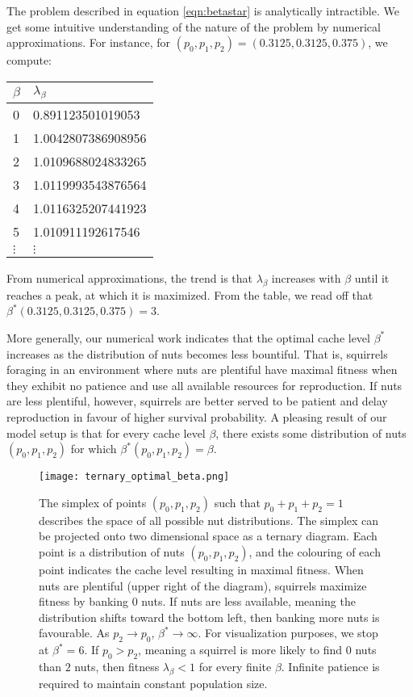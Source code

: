 \documentclass[titlepage, hidelinks, 12pt]{article}
\theoremstyle{plain}
\theoremstyle{remark}
\theoremstyle{definition}
\begin{document}
The problem described in equation \ref{eqn:betastar} is analytically intractible. We get some intuitive understanding of the nature of the problem
by numerical approximations. For instance, for $(p_0, p_1, p_2) = (0.3125, 0.3125, 0.375)$, we compute:
\begin{table}[H]
    \centering
\begin{tabular}{l|l}
$\beta$ & $\lambda_\beta$    \\ \hline
0       & 0.891123501019053  \\
1       & 1.0042807386908956 \\
2       & 1.0109688024833265 \\
3       & 1.0119993543876564 \\
4       & 1.0116325207441923 \\
5       & 1.010911192617546  \\
$\vdots$ & $\vdots$
\end{tabular}
\end{table}
From numerical approximations, the trend is that $\lambda_{\beta}$ increases with $\beta$ until it reaches a peak, at which it is maximized. 
From the table, we read off that $\beta^*(0.3125, 0.3125, 0.375) = 3$. 

More generally, our numerical work indicates that the optimal cache level $\beta^*$ increases as the distribution of nuts becomes less bountiful.
That is, squirrels foraging in an environment where nuts are plentiful have maximal fitness when they exhibit no patience and use all available
resources for reproduction. If nuts are less plentiful, however, squirrels are better served to be patient and delay reproduction in favour of
higher survival probability. A pleasing result of our model setup is that for every cache level $\beta$, there exists some distribution of nuts
$(p_0, p_1, p_2)$ for which $\beta^*(p_0, p_1, p_2) = \beta$.


\begin{figure}[H]
    \centering
    \texttt{[image: ternary\_optimal\_beta.png]}
    \caption{The simplex of points $(p_0, p_1, p_2)$ such that $p_0 + p_1 + p_2 =1$ describes the space of all possible nut distributions.
        The simplex can be projected onto two dimensional space as a ternary diagram. Each point is a distribution of nuts $(p_0, p_1, p_2)$,
        and 
    the colouring of each point indicates the cache level resulting in maximal fitness. When nuts are plentiful (upper right of the diagram),
squirrels maximize fitness by banking $0$ nuts. If nuts are less available, meaning the distribution shifts toward the bottom left, 
then banking more nuts is favourable. As $p_2\to p_0$, $\beta^*\to\infty$. For visualization purposes, we stop at $\beta^* = 6$. 
If $p_0 > p_2$, meaning a squirrel is more likely to find $0$ nuts than $2$ nuts, then fitness $\lambda_\beta < 1$
for every finite $\beta$. Infinite patience is required to maintain constant population size.}
    \label{fig:optimal_beta}
\end{figure}
\end{document}

